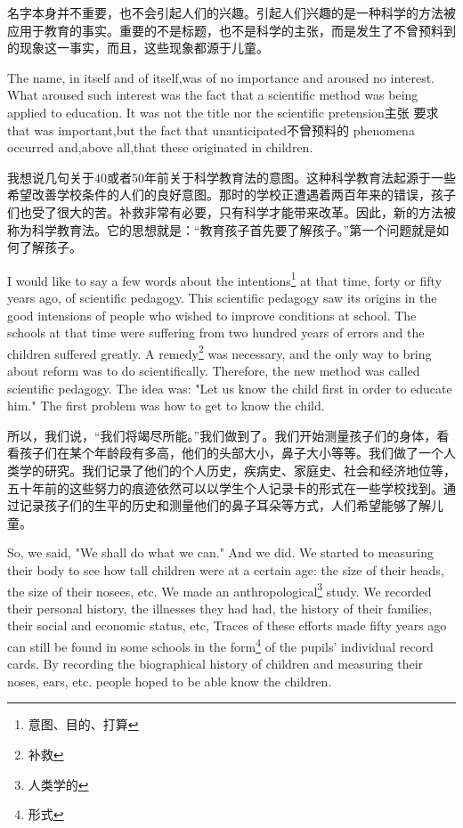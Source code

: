 \documentclass[lang=cn,10pt]{elegantbook}
\begin{document}
名字本身并不重要，也不会引起人们的兴趣。引起人们兴趣的是一种科学的方法被应用于教育的事实。重要的不是标题，也不是科学的主张，而是发生了不曾预料到的现象这一事实，而且，这些现象都源于儿童。

The name, in itself and of itself,was of no importance and aroused no interest. What aroused such interest was the fact that a scientific method was being applied to education. It was not the title nor the scientific pretension主张 要求 that was important,but the fact that unanticipated不曾预料的 phenomena occurred and,above all,that these originated in children.

我想说几句关于40或者50年前关于科学教育法的意图。这种科学教育法起源于一些希望改善学校条件的人们的良好意图。那时的学校正遭遇着两百年来的错误，孩子们也受了很大的苦。补救非常有必要，只有科学才能带来改革。因此，新的方法被称为科学教育法。它的思想就是：“教育孩子首先要了解孩子。”第一个问题就是如何了解孩子。

I would like to say a few words about the intentions\footnote{意图、目的、打算} at that time, forty or fifty years ago, of scientific pedagogy. This scientific pedagogy saw its origins in the good intensions of people who wished to improve conditions at school. The schools at that time were suffering from two hundred years of errors and the children suffered greatly. A remedy\footnote{补救} was necessary, and the only way to bring about reform was to do scientifically. Therefore, the new method was called scientific pedagogy. The idea was: "Let us know the child first in order to educate him." The first problem was how to get to know the child.

所以，我们说，“我们将竭尽所能。”我们做到了。我们开始测量孩子们的身体，看看孩子们在某个年龄段有多高，他们的头部大小，鼻子大小等等。我们做了一个人类学的研究。我们记录了他们的个人历史，疾病史、家庭史、社会和经济地位等，五十年前的这些努力的痕迹依然可以以学生个人记录卡的形式在一些学校找到。通过记录孩子们的生平的历史和测量他们的鼻子耳朵等方式，人们希望能够了解儿童。

So, we said, "We shall do what we can." And we did. We started to measuring their body to see how tall children were at a certain age: the size of their heads, the size of their nosees, etc. We made an anthropological\footnote{人类学的} study. We recorded their personal history, the illnesses they had had, the history of their families, their social and economic status, etc, Traces of these efforts made fifty years ago can still be found in some schools in the form\footnote{形式} of the pupils' individual record cards. By recording the biographical history of children and measuring their noses, ears, etc. people hoped to be able know the children.
\end{document}
